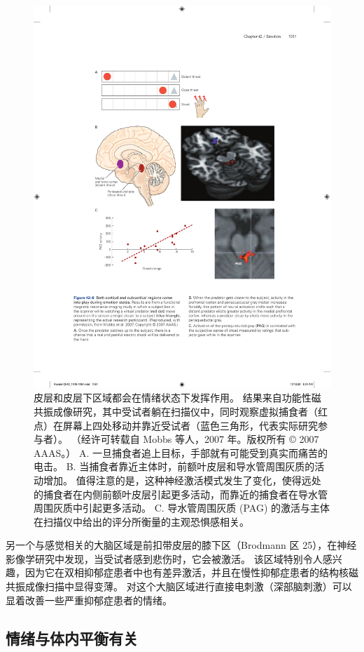 \begin{figure}[htbp]
	\centering
	\includegraphics[width=0.75\linewidth]{chap42/fig_42_8}
	\caption{皮层和皮层下区域都会在情绪状态下发挥作用。 结果来自功能性磁共振成像研究，其中受试者躺在扫描仪中，同时观察虚拟捕食者（红点）在屏幕上四处移动并靠近受试者（蓝色三角形，代表实际研究参与者）。 （经许可转载自 Mobbs 等人，2007 年。版权所有 © 2007 AAAS。） A. 一旦捕食者追上目标，手部就有可能受到真实而痛苦的电击。 B. 当捕食者靠近主体时，前额叶皮层和导水管周围灰质的活动增加。 值得注意的是，这种神经激活模式发生了变化，使得远处的捕食者在内侧前额叶皮层引起更多活动，而靠近的捕食者在导水管周围灰质中引起更多活动。 C. 导水管周围灰质 (PAG) 的激活与主体在扫描仪中给出的评分所衡量的主观恐惧感相关。}
	\label{fig:42_8}
\end{figure}


另一个与感觉相关的大脑区域是前扣带皮层的膝下区（Brodmann 区 25），在神经影像学研究中发现，当受试者感到悲伤时，它会被激活。
该区域特别令人感兴趣，因为它在双相抑郁症患者中也有差异激活，并且在慢性抑郁症患者的结构核磁共振成像扫描中显得变薄。
对这个大脑区域进行直接电刺激（深部脑刺激）可以显着改善一些严重抑郁症患者的情绪。



\subsection{情绪与体内平衡有关}

